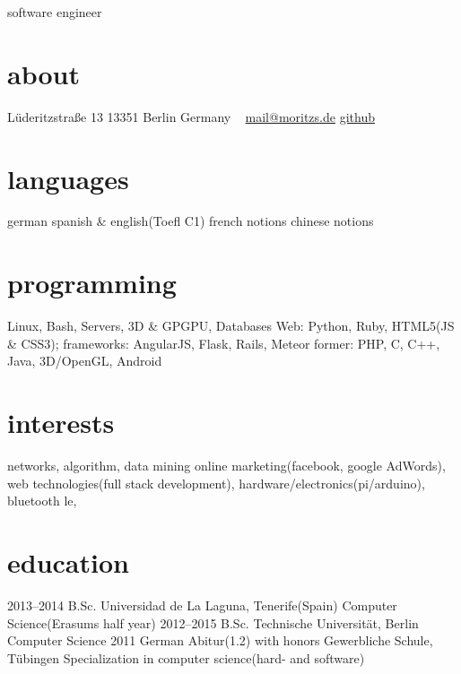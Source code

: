 \documentclass[]{friggeri-cv}
\begin{document}
       {software engineer}


\begin{aside}
  \section{about}
    Lüderitzstraße 13
    13351 Berlin
    Germany
    ~
    \href{mailto:mail@moritz.de}{mail@moritzs.de}
    \href{https://github.com/moritzschaefer}{github}
  \section{languages}
    german
    spanish \&  english(Toefl C1)
    french notions
    chinese notions
  \section{programming}
    Linux, Bash, Servers, 3D \& GPGPU, Databases
    Web:
    Python, Ruby,
    HTML5(JS \& CSS3); frameworks: AngularJS, Flask, Rails, Meteor
    former:
    PHP, C, C++, Java, 3D/OpenGL, Android
\end{aside}

\section{interests}

networks, algorithm, data mining
online marketing(facebook, google AdWords),
web technologies(full stack development),
hardware/electronics(pi/arduino), bluetooth le,

\section{education}

\begin{entrylist}
  \entry
    {2013–2014}
    {B.Sc.}
    {Universidad de La Laguna, Tenerife(Spain)}
    {Computer Science(Erasums half year)}
  \entry
    {2012–2015}
    {B.Sc.}
    {Technische Universität, Berlin}
    {Computer Science}
  \entry
    {2011}
    {German Abitur(1.2) with honors}
    {Gewerbliche Schule, Tübingen}
    {Specialization in computer science(hard- and software)}
\end{entrylist}
\end{document}
